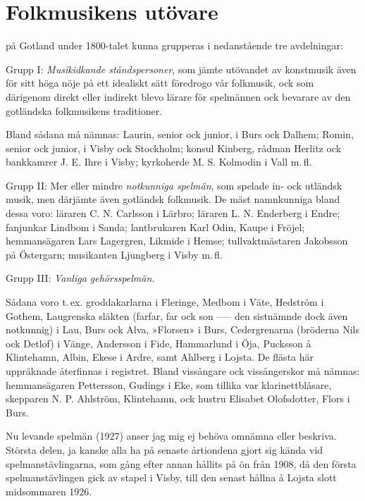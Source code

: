 \documentclass[a4paper,english]{article}
\begin{document}
\setlength{\columnsep}{0.5cm}
\section*{Folkmusikens utövare}

på Gotland under 1800-talet kunna grupperas i nedanstående
tre avdelningar:

Grupp I: \textit{Musikidkande ståndspersoner}, som jämte
utövandet av konstmusik även för sitt höga nöje på ett
idealiskt sätt föredrogo vår folkmusik, ock som därigenom
direkt eller indirekt blevo lärare för spelmännen ock bevarare
av den gotländska folkmusikens traditioner.

Bland sådana må nämnas: Laurin, senior ock junior, i
Burs ock Dalhem; Romin, senior ock junior, i Visby ock
Stockholm; konsul Kinberg, rådman Herlitz ock bankkamrer
J. E. Ihre i Visby; kyrkoherde M. S. Kolmodin i Vall m.\,fl.

Grupp II: Mer eller mindre \textit{notkunniga spelmän}, som
spelade in- ock utländsk musik, men därjämte även gotländsk
folkmusik.
De mäst namnkunniga bland dessa voro: läraren C. N.
Carlsson i Lärbro; läraren L. N. Enderberg i Endre; fanjunkar
Lindbom i Sanda; lantbrukaren Karl Odin, Kaupe i Fröjel;
hemmansägaren Lars Lagergren, Likmide i Hemse; tullvaktmästaren
Jakobsson på Östergarn; musikanten Ljungberg i Visby m.\,fl.

Grupp III: \textit{Vanliga gehörsspelmän.}

Sådana voro t.\,ex. groddakarlarna i Fleringe, Medbom i
Väte, Hedström i Gothem, Laugrenska släkten (farfar, far ock
son —-- den sistnämnde dock även notkunnig) i Lau, Burs ock
Alva, »Florsen» i Burs, Cedergrenarna (bröderna Nils ock
Detlof) i Vänge, Andersson i Fide, Hammarlund i Öja, Pucksson
å Klintehamn, Albin, Ekese i Ardre, samt Ahlberg i
Lojsta. De flästa här uppräknade återfinnas i registret.
Bland vissångare ock vissångerskor må nämnas: hemmansägaren
Pettersson, Gudings i Eke, som tillika var klarinettblåsare,
skepparen N. P. Ahlström, Klintehamn, ock hustru
Elisabet Olofsdotter, Flors i Burs.

Nu levande spelmän (1927) anser jag mig ej behöva omnämna
eller beskriva. Största delen, ja kanske alla ha på
senaste årtiondena gjort sig kända vid spelmanstävlingarna,
som gång efter annan hållits på ön från 1908, då den första
spelmanstävlingen gick av stapel i Visby, till den senast
hållna å Lojsta slott midsommaren 1926.
\end{document}
